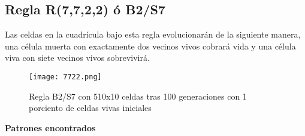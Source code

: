 \documentclass{article}
\begin{document}
 	\subsection{Regla R(7,7,2,2) ó B2/S7}
 	
 	 Las celdas en la cuadrícula bajo esta regla evolucionarán de la siguiente manera, una célula muerta con exactamente dos vecinos vivos cobrará vida y una célula viva con siete vecinos vivos sobrevivirá.
 	 
 	 \begin{figure}[htbp]
 	 	\centering       
 	 	\texttt{[image: 7722.png]}
 	 	\caption{Regla B2/S7 con 510x10 celdas tras 100 generaciones con 1 porciento de celdas vivas iniciales}
 	 	\label{fig:mi_imagen1} 
 	 \end{figure}
 	 
 	 \textbf{Patrones encontrados}
 	 
\end{document}

